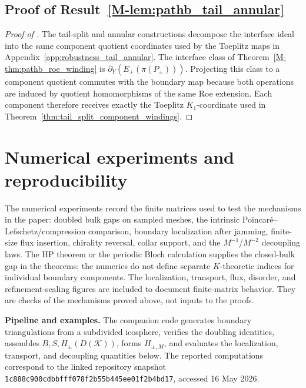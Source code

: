 \documentclass[11pt]{article}
\numberwithin{equation}{section}
\theoremstyle{definition}
\theoremstyle{remark}
\newcommand{\K}{\mathcal{K}}
\begin{document}
\subsection{Proof of Result~\ref{M-lem:pathb_tail_annular}}\label{app:proof:lem:pathb_tail_annular}
\begin{proof}[Proof of ]
The tail-split and annular constructions decompose the interface ideal into the same component
quotient coordinates used by the Toeplitz maps in Appendix~\ref{app:robustness_tail_annular}.
The interface class of Theorem~\ref{M-thm:pathb_roe_winding} is \(\partial_Y(E_+(\pi(P_\pm)))\). Projecting this class to a component quotient
commutes with the boundary map because both operations are induced by quotient homomorphisms of the
same Roe extension. Each component therefore receives exactly the Toeplitz \(K_1\)-coordinate used
in Theorem~\ref{thm:tail_split_component_windings}.
\end{proof}

\section{Numerical experiments and reproducibility}\label{sec:numerics}

The numerical experiments record the finite matrices used to test the mechanisms in the paper:
doubled bulk gaps on sampled meshes, the intrinsic Poincar\'e--Lefschetz/compression comparison,
boundary localization after jamming, finite-size flux insertion, chirality reversal, collar support,
and the \(M^{-1}\)/\(M^{-2}\) decoupling laws. The HP theorem or the periodic Bloch calculation
supplies the closed-bulk gap in the theorems; the numerics do not define separate
\(K\)-theoretic indices for individual boundary components. The localization, transport, flux,
disorder, and refinement-scaling figures are included to document finite-matrix behavior. They are
checks of the mechanisms proved above, not inputs to the proofs.

\medskip\noindent\textbf{Pipeline and examples.}
The companion code generates boundary triangulations from a subdivided icosphere, verifies the
doubling identities, assembles \(B,S,H_\pm(D(\K))\), forms \(H_{\pm,M}\), and evaluates the
localization, transport, and decoupling quantities below. The reported computations correspond to
the linked repository snapshot
\texttt{1c888c900cdbbfff078f2b55b445ee01f2b4bd17}, accessed 16 May 2026.
\end{document}

